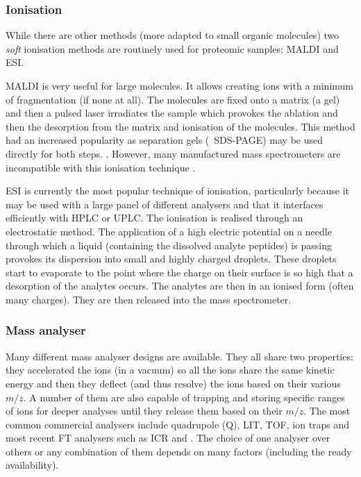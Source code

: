 \subsubsection{Ionisation}

While there are other methods (more adapted to small organic molecules)
two \emph{soft} ionisation methods are routinely used for proteomic samples:
\acrfull{MALDI} and \acrfull{ESI}.

\gls{MALDI} is very useful for large molecules. It allows creating ions with a
minimum of fragmentation (if none at all). The molecules are fixed onto a matrix
(a gel) and then a pulsed \gls{laser} irradiates the sample which provokes the
ablation and then the desorption from the matrix and ionisation of the molecules.
This method had an increased popularity as separation gels (\eg\ \gls{SDS-PAGE})
may be used directly for both steps. . However, many
manufactured mass spectrometers are incompatible with this ionisation technique
.

\gls{ESI} is currently the most popular technique of ionisation, particularly
because it may be used with a large panel of different analysers and that it
interfaces efficiently with \gls{HPLC} or \gls{UPLC}. The ionisation is realised
through an electrostatic method. The application of a high electric potential on
a needle through which a liquid (containing the dissolved analyte peptides)
is passing provokes its dispersion into small and highly charged droplets.
These droplets start to evaporate to the point where the charge on their surface
is so high that a desorption of the analytes occurs.  The analytes are then
in an ionised form (often many charges). They are then released into the mass
spectrometer. 

\subsubsection{Mass analyser}

Many different mass analyser designs are available. They all share two properties:
they accelerated the ions (in a vacuum) so all the ions share the same kinetic
energy and then they deflect (and thus resolve) the ions based on
their various $m/z$.  A number of them are also
capable of trapping and storing specific ranges of ions for deeper analyses until
they release them based on their $m/z$.
The most common commercial analysers include quadrupole (Q), \acrfull{LIT},
\acrfull{TOF}, ion traps and most recent \gls{FT} analysers such as \acrfull{ICR}
and \orbi. The choice of one analyser over others or any combination of them
depends on many factors (including the ready availability). 

